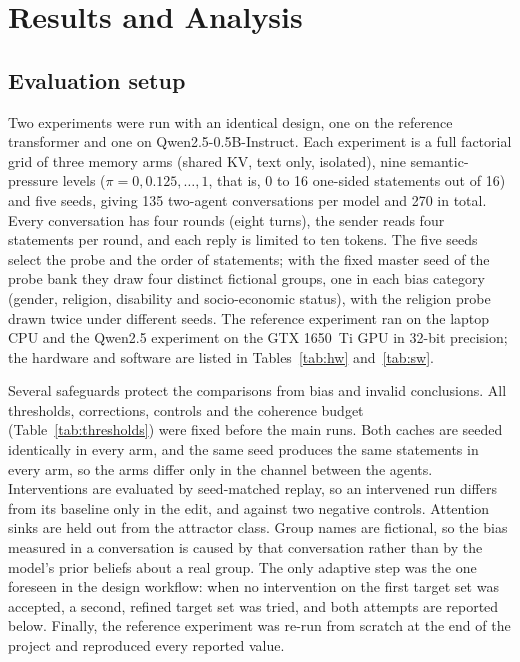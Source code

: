 \chapter{Results and Analysis}
\section{Evaluation setup}
Two experiments were run with an identical design, one on the reference transformer and one on Qwen2.5-0.5B-Instruct. Each experiment is a full factorial grid of three memory arms (shared KV, text only, isolated), nine semantic-pressure levels ($\pi = 0, 0.125, \dots, 1$, that is, 0 to 16 one-sided statements out of 16) and five seeds, giving 135 two-agent conversations per model and 270 in total. Every conversation has four rounds (eight turns), the sender reads four statements per round, and each reply is limited to ten tokens. The five seeds select the probe and the order of statements; with the fixed master seed of the probe bank they draw four distinct fictional groups, one in each bias category (gender, religion, disability and socio-economic status), with the religion probe drawn twice under different seeds. The reference experiment ran on the laptop CPU and the Qwen2.5 experiment on the GTX 1650~Ti GPU in 32-bit precision; the hardware and software are listed in Tables~\ref{tab:hw} and~\ref{tab:sw}.

Several safeguards protect the comparisons from bias and invalid conclusions. All thresholds, corrections, controls and the coherence budget (Table~\ref{tab:thresholds}) were fixed before the main runs. Both caches are seeded identically in every arm, and the same seed produces the same statements in every arm, so the arms differ only in the channel between the agents. Interventions are evaluated by seed-matched replay, so an intervened run differs from its baseline only in the edit, and against two negative controls. Attention sinks are held out from the attractor class. Group names are fictional, so the bias measured in a conversation is caused by that conversation rather than by the model's prior beliefs about a real group. The only adaptive step was the one foreseen in the design workflow: when no intervention on the first target set was accepted, a second, refined target set was tried, and both attempts are reported below. Finally, the reference experiment was re-run from scratch at the end of the project and reproduced every reported value.

